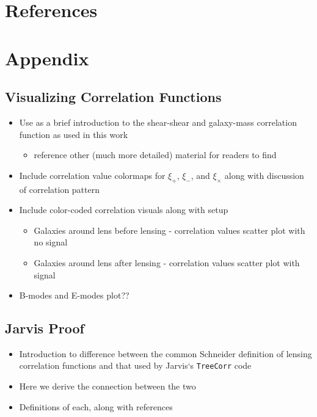 \documentclass[%
 reprint,
 amsmath,amssymb,
 aps,
]{revtex4-1}
\begin{document}
\section{References}

%
%

\onecolumngrid
\section{Appendix}

\subsection{Visualizing Correlation Functions}

\begin{itemize}
\item Use as a brief introduction to the shear-shear and galaxy-mass correlation function as used in this work
    \begin{itemize}
    \item reference other (much more detailed) material for readers to find
    \end{itemize}
\item Include correlation value colormaps for $\xi_+$, $\xi_-$, and $\xi_\times$ along with discussion of correlation pattern
\item Include color-coded correlation visuals along with setup
    \begin{itemize}
    \item Galaxies around lens before lensing - correlation values scatter plot with no signal
    \item Galaxies around lens after lensing - correlation values scatter plot with signal
    \end{itemize}
\item B-modes and E-modes plot??
\end{itemize}

\subsection{Jarvis Proof}

\begin{itemize}
\item Introduction to difference between the common Schneider definition of lensing correlation functions and that used by Jarvis`s \texttt{TreeCorr} code
\item Here we derive the connection between the two
\item Definitions of each, along with references
\end{itemize}
\end{document}
